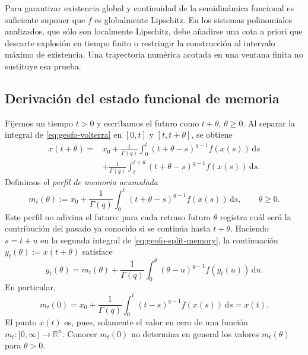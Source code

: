 

Para garantizar existencia global y continuidad de la semidinámica funcional
es suficiente suponer que \(f\) es globalmente Lipschitz. En los sistemas
polinomiales analizados, que sólo son localmente Lipschitz, debe
añadirse una cota a priori que descarte explosión en tiempo finito o restringir
la construcción al intervalo máximo de existencia. Una trayectoria numérica
acotada en una ventana finita no sustituye esa prueba.

\subsection{Derivación del estado funcional de memoria}
\label{subsec:geofo-memory-profile}

Fijemos un tiempo \(t>0\) y escribamos el futuro como \(t+\theta\),
\(\theta\geq0\). Al separar la integral de \cref{eq:geofo-volterra} en
\([0,t]\) y \([t,t+\theta]\), se obtiene
\begin{align}
 x(t+\theta)
 ={}&x_0+\frac1{\Gamma(q)}
 \int_0^t(t+\theta-s)^{q-1}f(x(s))\,\mathrm ds
 \nonumber\\
 &+\frac1{\Gamma(q)}
 \int_t^{t+\theta}(t+\theta-s)^{q-1}f(x(s))\,\mathrm ds.
 \label{eq:geofo-split-memory}
\end{align}
Definimos el \emph{perfil de memoria acumulada}
\begin{equation}
 m_t(\theta):=x_0+\frac1{\Gamma(q)}
 \int_0^t(t+\theta-s)^{q-1}f(x(s))\,\mathrm ds,
 \qquad \theta\geq0.
 \label{eq:geofo-memory-profile}
\end{equation}
Este perfil no adivina el futuro: para cada retraso futuro \(\theta\) registra
cuál será la contribución del pasado ya conocido si se continúa hasta
\(t+\theta\). Haciendo \(s=t+u\) en la segunda integral de
\cref{eq:geofo-split-memory}, la continuación \(y_t(\theta):=x(t+\theta)\)
satisface
\begin{equation}
 y_t(\theta)=m_t(\theta)+\frac1{\Gamma(q)}
 \int_0^\theta(\theta-u)^{q-1}f(y_t(u))\,\mathrm du.
 \label{eq:geofo-shifted-volterra}
\end{equation}
En particular,
\begin{equation}
 m_t(0)=x_0+\frac1{\Gamma(q)}
 \int_0^t(t-s)^{q-1}f(x(s))\,\mathrm ds=x(t).
 \label{eq:geofo-evaluation-state}
\end{equation}
El punto \(x(t)\) es, pues, solamente el valor en cero de una función
\(m_t:[0,\infty)\to\mathbb R^n\). Conocer \(m_t(0)\) no determina en general
los valores \(m_t(\theta)\) para \(\theta>0\).

